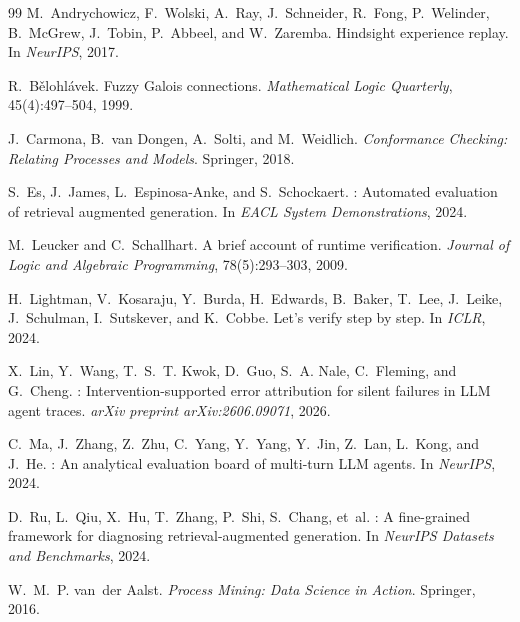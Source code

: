 \documentclass{article}
\begin{document}
\clearpage
\begin{thebibliography}{99}
M.~Andrychowicz, F.~Wolski, A.~Ray, J.~Schneider, R.~Fong, P.~Welinder, B.~McGrew, J.~Tobin, P.~Abbeel, and W.~Zaremba.
\newblock Hindsight experience replay.
\newblock In \emph{NeurIPS}, 2017.

R.~B\v{e}lohl\'avek.
\newblock Fuzzy Galois connections.
\newblock \emph{Mathematical Logic Quarterly}, 45(4):497--504, 1999.

J.~Carmona, B.~van Dongen, A.~Solti, and M.~Weidlich.
\newblock \emph{Conformance Checking: Relating Processes and Models}.
\newblock Springer, 2018.

S.~Es, J.~James, L.~Espinosa-Anke, and S.~Schockaert.
: Automated evaluation of retrieval augmented generation.
\newblock In \emph{EACL System Demonstrations}, 2024.

M.~Leucker and C.~Schallhart.
\newblock A brief account of runtime verification.
\newblock \emph{Journal of Logic and Algebraic Programming}, 78(5):293--303, 2009.

H.~Lightman, V.~Kosaraju, Y.~Burda, H.~Edwards, B.~Baker, T.~Lee, J.~Leike, J.~Schulman, I.~Sutskever, and K.~Cobbe.
\newblock Let's verify step by step.
\newblock In \emph{ICLR}, 2024.

X.~Lin, Y.~Wang, T.~S.~T. Kwok, D.~Guo, S.~A. Nale, C.~Fleming, and G.~Cheng.
: Intervention-supported error attribution for silent failures in {LLM} agent traces.
\newblock \emph{arXiv preprint arXiv:2606.09071}, 2026.

C.~Ma, J.~Zhang, Z.~Zhu, C.~Yang, Y.~Yang, Y.~Jin, Z.~Lan, L.~Kong, and J.~He.
: An analytical evaluation board of multi-turn {LLM} agents.
\newblock In \emph{NeurIPS}, 2024.

D.~Ru, L.~Qiu, X.~Hu, T.~Zhang, P.~Shi, S.~Chang, et~al.
: A fine-grained framework for diagnosing retrieval-augmented generation.
\newblock In \emph{NeurIPS Datasets and Benchmarks}, 2024.

W.~M.~P. van~der Aalst.
\newblock \emph{Process Mining: Data Science in Action}.
\newblock Springer, 2016.


\end{thebibliography}
\end{document}
